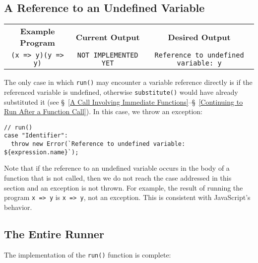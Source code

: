 \documentclass[12pt, oneside]{book}
\begin{document}
\subsection{A Reference to an Undefined Variable}

\begin{center}
\begin{tabular}{c|c|c}
\textbf{Example Program} & \textbf{Current Output} & \textbf{Desired Output} \\
\texttt{(x => y)(y => y)} & \texttt{NOT IMPLEMENTED YET} & \texttt{Reference to undefined variable: y} \\
\end{tabular}
\end{center}

\noindent The only case in which \texttt{run()} may encounter a variable reference directly is if the referenced variable is undefined, otherwise \texttt{substitute()} would have already substituted it (see §~\ref{A Call Involving Immediate Functions}–§~\ref{Continuing to Run After a Function Call}). In this case, we throw an exception:

\begin{verbatim}
// run()
case "Identifier":
  throw new Error(`Reference to undefined variable: ${expression.name}`);
\end{verbatim}

Note that if the reference to an undefined variable occurs in the body of a function that is not called, then we do not reach the case addressed in this section and an exception is not thrown. For example, the result of running the program \texttt{x => y} is \texttt{x => y}, not an exception. This is consistent with JavaScript’s behavior.

\subsection{The Entire Runner}
\label{The Entire Runner}

The implementation of the \texttt{run()} function is complete:
\end{document}
